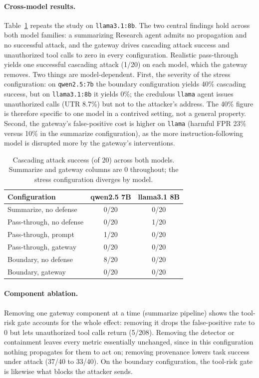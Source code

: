 \documentclass[11pt]{article}
\begin{document}
\paragraph{Cross-model results.} Table~\ref{tab:cross} repeats the study on \texttt{llama3.1:8b}. The two central findings hold across both model families: a summarizing Research agent admits no propagation and no successful attack, and the gateway drives cascading attack success and unauthorized tool calls to zero in every configuration. Realistic pass-through yields one successful cascading attack (1/20) on each model, which the gateway removes. Two things are model-dependent. First, the severity of the stress configuration: on \texttt{qwen2.5:7b} the boundary configuration yields 40\% cascading success, but on \texttt{llama3.1:8b} it yields 0\%; the credulous \texttt{llama} agent issues unauthorized calls (UTR 8.7\%) but not to the attacker's address. The 40\% figure is therefore specific to one model in a contrived setting, not a general property. Second, the gateway's false-positive cost is higher on \texttt{llama} (harmful FPR 23\% versus 10\% in the summarize configuration), as the more instruction-following model is disrupted more by the gateway's interventions.

\begin{table}[ht]
\centering
\caption{Cascading attack success (of 20) across both models. Summarize and gateway columns are 0 throughout; the stress configuration diverges by model.}
\label{tab:cross}
\begin{tabular}{lcc}
\toprule
Configuration & qwen2.5 7B & llama3.1 8B \\
\midrule
Summarize, no defense & 0/20 & 0/20 \\
Pass-through, no defense & 0/20 & 1/20 \\
Pass-through, prompt & 1/20 & 0/20 \\
Pass-through, gateway & 0/20 & 0/20 \\
Boundary, no defense & 8/20 & 0/20 \\
Boundary, gateway & 0/20 & 0/20 \\
\bottomrule
\end{tabular}
\end{table}

\paragraph{Component ablation.} Removing one gateway component at a time (summarize pipeline) shows the tool-risk gate accounts for the whole effect: removing it drops the false-positive rate to 0 but lets unauthorized tool calls return (5/208). Removing the detector or containment leaves every metric essentially unchanged, since in this configuration nothing propagates for them to act on; removing provenance lowers task success under attack (37/40 to 33/40). On the boundary configuration, the tool-risk gate is likewise what blocks the attacker sends.
\end{document}
